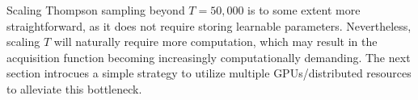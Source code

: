 Scaling Thompson sampling beyond $T=50,\!000$ is to some extent more straightforward, as it does not require storing learnable parameters.
Nevertheless, scaling $T$ will naturally require more computation, which may result in the acquisition function becoming increasingly computationally demanding.
The next section introcues a simple strategy to utilize multiple GPUs/distributed resources to alleviate this bottleneck.
